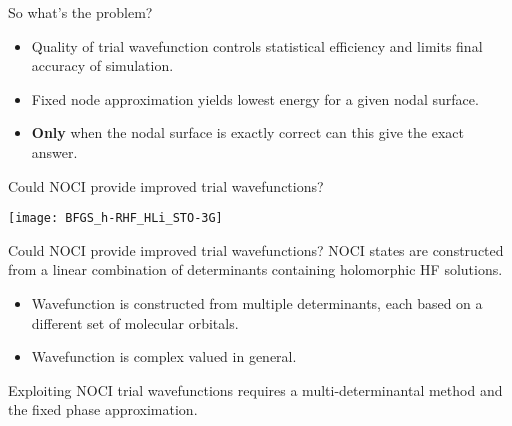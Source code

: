 \documentclass{beamer}
\begin{document}
\begin{frame}{So what's the problem?}
  \begin{itemize}
    \item Quality of trial wavefunction controls statistical efficiency and limits final accuracy of simulation.
    \item Fixed node approximation yields lowest energy for a given nodal surface.
    \item \textbf{Only} when the nodal surface is exactly correct can this give the exact answer.
  \end{itemize}
\end{frame}
\begin{frame}{Could NOCI provide improved trial wavefunctions?}
  \vspace{-0.8em}
  \begin{center}
    \texttt{[image: BFGS\_h-RHF\_HLi\_STO-3G]}
  \end{center}

\end{frame}
\begin{frame}{Could NOCI provide improved trial wavefunctions?}
  NOCI states are constructed from a linear combination of determinants containing holomorphic HF solutions.
\vspace{1em}  
  \begin{itemize}
   \item Wavefunction is constructed from multiple determinants, each based on a different set of molecular orbitals.
   \item Wavefunction is complex valued in general.
  \end{itemize}
  \vspace{1em}  
  Exploiting NOCI trial wavefunctions requires a \alert{multi-determinantal} method and the \alert{fixed phase approximation}.
\end{frame}
\end{document}
